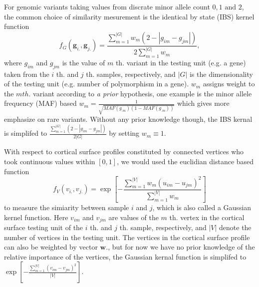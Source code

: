 For genomic variants taking values from discrate minor allele count ${0, 1 \textrm{ and } 2}$, the common choice of similarity mesurement is the identical by state (IBS) kernel function
\label{eq:wSG}
\newcommand{\vg}{\pmb{g}}
\newcommand{\GG}{\pmb{G}}
\[ f_G(\vg_{i.}, \vg_{j.}) = \frac{\sum_{m=1}^{|G|}{w_m(2 - |g_{im} - g_{jm}|)}} {2\sum_{m=1}^{|G|}{w_m}}, \]
where $g_{im}$ and $g_{jm}$ is the value of $m$ th. variant in the testing unit (e.g. a gene) taken from the $i$ th. and $j$ th. samples, respectively, and $|G|$ is the dimensionality of the testing unit (e.g. number of polymorphism in a gene). $w_m$ assigns weight to the $m th.$ variant according to \textit{a prior} hypothesis, one example is the minor allele frequency (MAF) based $w_m=\frac{1}{\sqrt{MAF(g_{.m})(1-MAF(g_{.m}))}}$ which gives more emphasize on rare variants. Without any prior knowledge though, the IBS kernal is simplifed to $\frac{\sum_{m = 1}^{|G|}{(2-|g_{im} - g_{jm}|)}}{2|G|}$ by setting $w_m \equiv 1$.

With respect to cortical surface profiles constituted by connected vertices who took continuous values within $[0,1]$, we would used the euclidian distance based function
\label{eq:wSV}
\[  f_V(v_{i.},v_{j.}) = \exp{ [-\frac{\sum_{m=1}^{|V|}{w_m(u_{im}-u_{jm})^2}} {\sum_{m=1}^{|V|}{w_m}}] } \]
to measure the simiarity between sample $i$ and $j$, which is also called a Gaussian kernel function. Here $v_{im}$ and $v_{jm}$ are values of the $m$ th. vertex in the cortical surface testing unit of the $i$ th. and $j$ th. sample, respectively, and $|V|$ denote the number of vertices in the testing unit. The vertices in the cortical surface profile can also be weighted by vector $\boldsymbol{w}.$, but for now we have no prior knowledge of the relative importance of the vertices, the Gaussian kernal function is simplifed to $\exp{[-\frac{\sum_{m=1}^{|V|}{(v_{im}-v_{jm})^2}} {|V|}]}$.

